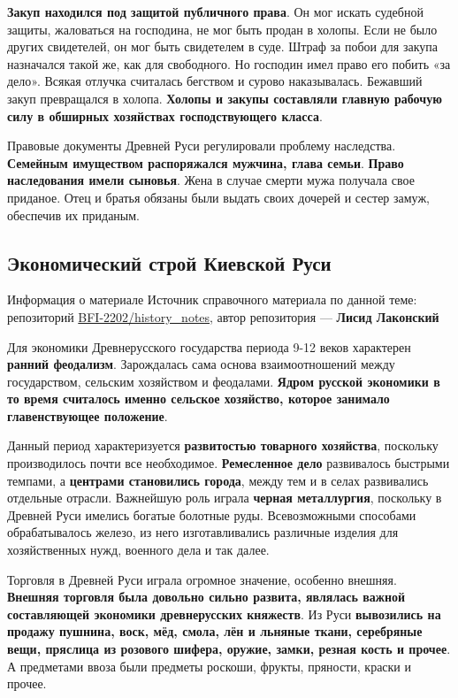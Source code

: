 \documentclass{article}
\begin{document}
\textbf{Закуп находился под защитой публичного права}. Он мог искать судебной защиты, жаловаться на господина, не мог быть продан в холопы. Если не было других свидетелей, он мог быть свидетелем в суде. Штраф за побои для закупа назначался такой же, как для свободного. Но господин имел право его побить «за дело». Всякая отлучка считалась бегством и сурово наказывалась. Бежавший закуп превращался в холопа. \textbf{Холопы и закупы составляли главную рабочую силу в обширных хозяйствах господствующего класса}.

\hfill

Правовые документы Древней Руси регулировали проблему наследства. \textbf{Семейным имуществом распоряжался мужчина, глава семьи}. \textbf{Право наследования имели сыновья}. Жена в случае смерти мужа получала свое приданое. Отец и братья обязаны были выдать своих дочерей и сестер замуж, обеспечив их приданым.

\subsection{Экономический строй Киевской Руси}

\begin{bclogo}[logo=\bcinfo, couleurBarre=orange, noborder=true, couleur=white]{Информация о материале}
    Источник справочного материала по данной теме: репозиторий \href{https://github.com/BFI-2202/history_notes}{BFI-2202/history\_notes}, автор репозитория — \textbf{Лисид Лаконский}
\end{bclogo}

Для экономики Древнерусского государства периода 9-12 веков характерен \textbf{ранний феодализм}.
Зарождалась сама основа взаимоотношений между государством, сельским хозяйством и феодалами. \textbf{Ядром русской экономики в то время считалось именно сельское хозяйство, которое занимало главенствующее положение}.

Данный период характеризуется \textbf{развитостью товарного хозяйства}, поскольку производилось почти все необходимое. \textbf{Ремесленное дело} развивалось быстрыми темпами, а \textbf{центрами становились города}, между тем и в селах развивались отдельные отрасли. Важнейшую роль играла \textbf{черная металлургия}, поскольку в Древней Руси имелись богатые болотные руды. Всевозможными способами обрабатывалось железо, из него изготавливались различные изделия для хозяйственных нужд, военного дела и так далее.

\hfill

Торговля в Древней Руси играла огромное значение, особенно внешняя. \textbf{Внешняя торговля была довольно сильно развита, являлась важной составляющей экономики древнерусских княжеств}. Из Руси \textbf{вывозились на продажу пушнина, воск, мёд, смола, лён и льняные ткани, серебряные вещи, пряслица из розового шифера, оружие, замки, резная кость и прочее}. А предметами ввоза были предметы роскоши, фрукты, пряности, краски и прочее.
\end{document}
